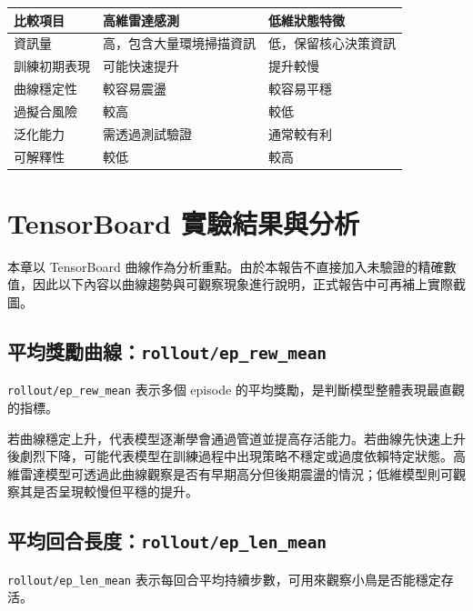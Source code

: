 \documentclass[12pt,a4paper]{ctexart}
\begin{document}
\begin{longtable}{lll}
\toprule
比較項目 & 高維雷達感測 & 低維狀態特徵 \\
\midrule
\endhead
資訊量 & 高，包含大量環境掃描資訊 & 低，保留核心決策資訊 \\
訓練初期表現 & 可能快速提升 & 提升較慢 \\
曲線穩定性 & 較容易震盪 & 較容易平穩 \\
過擬合風險 & 較高 & 較低 \\
泛化能力 & 需透過測試驗證 & 通常較有利 \\
可解釋性 & 較低 & 較高 \\
\bottomrule
\end{longtable}

\section{TensorBoard 實驗結果與分析}

本章以 TensorBoard 曲線作為分析重點。由於本報告不直接加入未驗證的精確數值，因此以下內容以曲線趨勢與可觀察現象進行說明，正式報告中可再補上實際截圖。

\subsection{平均獎勵曲線：\texttt{rollout/ep\_rew\_mean}}

\texttt{rollout/ep\_rew\_mean} 表示多個 episode 的平均獎勵，是判斷模型整體表現最直觀的指標。

\begin{center}
\end{center}

若曲線穩定上升，代表模型逐漸學會通過管道並提高存活能力。若曲線先快速上升後劇烈下降，可能代表模型在訓練過程中出現策略不穩定或過度依賴特定狀態。高維雷達模型可透過此曲線觀察是否有早期高分但後期震盪的情況；低維模型則可觀察其是否呈現較慢但平穩的提升。

\subsection{平均回合長度：\texttt{rollout/ep\_len\_mean}}

\texttt{rollout/ep\_len\_mean} 表示每回合平均持續步數，可用來觀察小鳥是否能穩定存活。

\begin{center}
\end{center}
\end{document}

